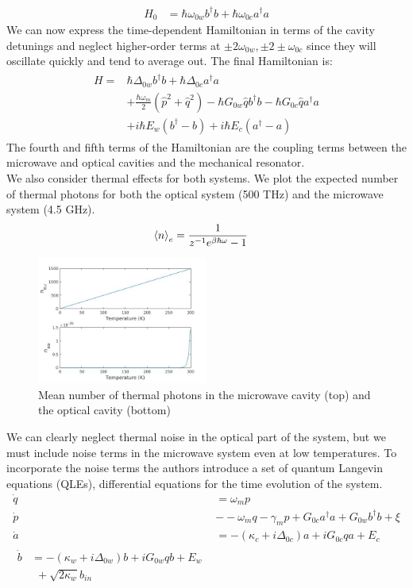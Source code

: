 \documentclass[a4paper,10pt,twocolumn]{article}
\numberwithin{equation}{section}
\begin{document}
\begin{align}
 H_0 &= \hbar\omega_{0w}b^\dagger b +\hbar\omega_{0c}a^\dagger a
\end{align}
We can now express the time-dependent Hamiltonian in terms of the cavity detunings and neglect higher-order terms at $\pm2\omega_{0w},\pm2\pm\omega_{0c}$ since they will oscillate quickly and tend to average out.
The final Hamiltonian is:
\begin{align}
\begin{split}
 H = &\hbar\Delta_{0w}b^\dagger b+\hbar\Delta_{0c}a^\dagger a\\
     &+\frac{\hbar\omega_m}{2}(\hat{p}^2+\hat{q}^2)-\hbar G_{0w}\hat{q}b^\dagger b-\hbar G_{0c}\hat{q}a^\dagger a\\
     &+i\hbar E_w(b^\dagger -b)+i\hbar E_c(a^\dagger -a )
\end{split}
\end{align}
The fourth and fifth terms of the Hamiltonian are the coupling terms between the microwave and optical cavities and the mechanical resonator.\\ 
We also consider thermal effects for both systems. We plot the expected number of thermal photons for both the optical system (500 THz) and the microwave system (4.5 GHz).
\begin{align}
 \braket{n}_e &= \frac{1}{z^{-1}e^{\beta \hbar \omega}-1}
\end{align}
\begin{figure}[ht]
 \caption{Mean number of thermal photons in the microwave cavity (top) and the optical cavity (bottom)}
 \centering
   \includegraphics[width=0.5\textwidth]{ThermalPhotons}
\end{figure}
We can clearly neglect thermal noise in the optical part of the system, but we must include noise terms in the microwave system even at low temperatures.
To incorporate the noise terms the authors introduce a set of quantum Langevin equations (QLEs), differential equations for the time evolution of the system.
\begin{align}
 \dot{q} &= \omega_mp\\
 \dot{p} &- -\omega_mq-\gamma_mp+G_{0c}a^\dagger a+G_{0w}b^\dagger b +\xi\\
 \dot{a} &= -(\kappa_c+i\Delta_{0c})a+iG_{0c}qa+E_c\\
 \begin{split}
 \dot{b} &= -(\kappa_w+i\Delta_{0w})b+iG_{0w}qb+E_w\\
         &\ \ +\sqrt{2\kappa_w}b_{in}
 \end{split}
\end{align}
\end{document}
